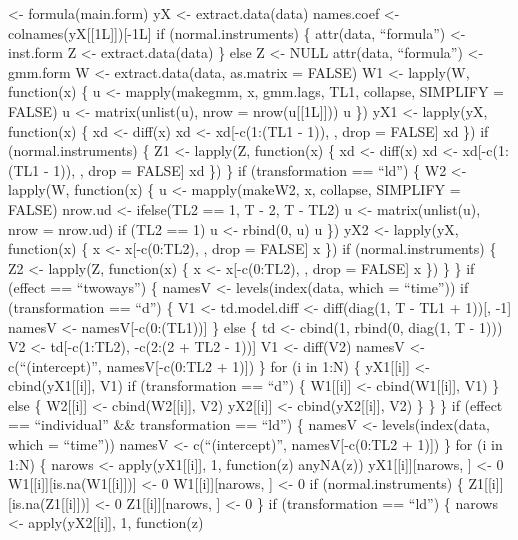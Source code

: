 \documentclass[
]{article}
\begin{document}
\textless- formula(main.form) yX \textless- extract.data(data)
names.coef \textless- colnames(yX{[}{[}1L{]}{]}){[}-1L{]} if
(normal.instruments) \{ attr(data, ``formula'') \textless- inst.form Z
\textless- extract.data(data) \} else Z \textless- NULL attr(data,
``formula'') \textless- gmm.form W \textless- extract.data(data,
as.matrix = FALSE) W1 \textless- lapply(W, function(x) \{ u \textless-
mapply(makegmm, x, gmm.lags, TL1, collapse, SIMPLIFY = FALSE) u
\textless- matrix(unlist(u), nrow = nrow(u{[}{[}1L{]}{]})) u \}) yX1
\textless- lapply(yX, function(x) \{ xd \textless- diff(x) xd \textless-
xd{[}-c(1:(TL1 - 1)), , drop = FALSE{]} xd \}) if (normal.instruments)
\{ Z1 \textless- lapply(Z, function(x) \{ xd \textless- diff(x) xd
\textless- xd{[}-c(1:(TL1 - 1)), , drop = FALSE{]} xd \}) \} if
(transformation == ``ld'') \{ W2 \textless- lapply(W, function(x) \{ u
\textless- mapply(makeW2, x, collapse, SIMPLIFY = FALSE) nrow.ud
\textless- ifelse(TL2 == 1, T - 2, T - TL2) u \textless-
matrix(unlist(u), nrow = nrow.ud) if (TL2 == 1) u \textless- rbind(0, u)
u \}) yX2 \textless- lapply(yX, function(x) \{ x \textless-
x{[}-c(0:TL2), , drop = FALSE{]} x \}) if (normal.instruments) \{ Z2
\textless- lapply(Z, function(x) \{ x \textless- x{[}-c(0:TL2), , drop =
FALSE{]} x \}) \} \} if (effect == ``twoways'') \{ namesV \textless-
levels(index(data, which = ``time'')) if (transformation == ``d'') \{ V1
\textless- td.model.diff \textless- diff(diag(1, T - TL1 + 1)){[}, -1{]}
namesV \textless- namesV{[}-c(0:(TL1)){]} \} else \{ td \textless-
cbind(1, rbind(0, diag(1, T - 1))) V2 \textless- td{[}-c(1:TL2), -c(2:(2
+ TL2 - 1)){]} V1 \textless- diff(V2) namesV \textless-
c(``(intercept)'', namesV{[}-c(0:TL2 + 1){]}) \} for (i in 1:N) \{
yX1{[}{[}i{]}{]} \textless- cbind(yX1{[}{[}i{]}{]}, V1) if
(transformation == ``d'') \{ W1{[}{[}i{]}{]} \textless-
cbind(W1{[}{[}i{]}{]}, V1) \} else \{ W2{[}{[}i{]}{]} \textless-
cbind(W2{[}{[}i{]}{]}, V2) yX2{[}{[}i{]}{]} \textless-
cbind(yX2{[}{[}i{]}{]}, V2) \} \} \} if (effect == ``individual'' \&\&
transformation == ``ld'') \{ namesV \textless- levels(index(data, which
= ``time'')) namesV \textless- c(``(intercept)'', namesV{[}-c(0:TL2 +
1){]}) \} for (i in 1:N) \{ narows \textless- apply(yX1{[}{[}i{]}{]}, 1,
function(z) anyNA(z)) yX1{[}{[}i{]}{]}{[}narows, {]} \textless- 0
W1{[}{[}i{]}{]}{[}is.na(W1{[}{[}i{]}{]}){]} \textless- 0
W1{[}{[}i{]}{]}{[}narows, {]} \textless- 0 if (normal.instruments) \{
Z1{[}{[}i{]}{]}{[}is.na(Z1{[}{[}i{]}{]}){]} \textless- 0
Z1{[}{[}i{]}{]}{[}narows, {]} \textless- 0 \} if (transformation ==
``ld'') \{ narows \textless- apply(yX2{[}{[}i{]}{]}, 1, function(z)
\end{document}
